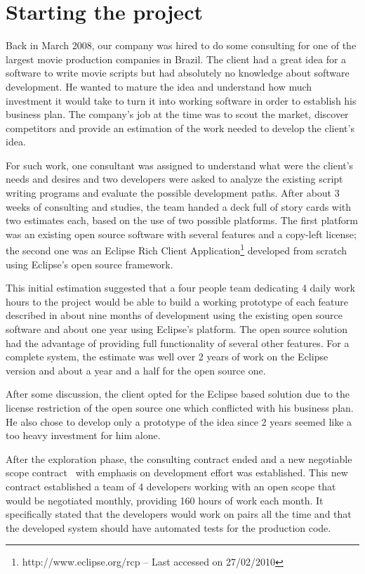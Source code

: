 \documentclass[lnbip]{svmultln}
\begin{document}
\section{Starting the project}
\label{sec:start}

Back in March 2008, our company was hired to do some consulting for
one of the largest movie production companies in Brazil. The client
had a great idea for a software to write movie scripts but had
absolutely no knowledge about software development.  He wanted to
mature the idea and understand how much investment it would take to
turn it into working software in order to establish his business
plan. The company's job at the time was to scout the market, discover
competitors and provide an estimation of the work needed to develop
the client's idea.

For such work, one consultant was assigned to understand what were the
client's needs and desires and two developers were asked to analyze
the existing script writing programs and evaluate the possible
development paths. After about 3 weeks of consulting and studies, the
team handed a deck full of story cards with two estimates each, based
on the use of two possible platforms. The first platform was an
existing open source software with several features and a copy-left
license; the second one was an Eclipse Rich Client
Application\footnote{http://www.eclipse.org/rcp -- Last accessed on
  27/02/2010} developed from scratch using Eclipse's open source
framework.

This initial estimation suggested that a four people team dedicating 4
daily work hours to the project would be able to build a working
prototype of each feature described in about nine months of
development using the existing open source software and about one year
using Eclipse's platform. The open source solution had the advantage
of providing full functionality of several other features. For a
complete system, the estimate was well over 2 years of work on the
Eclipse version and about a year and a half for the open source one.

After some discussion, the client opted for the Eclipse based solution
due to the license restriction of the open source one which conflicted
with his business plan. He also chose to develop only a prototype of
the idea since 2 years seemed like a too heavy investment for him
alone.

After the exploration phase, the consulting contract ended and a new
negotiable scope contract~\cite{XP} with emphasis on development
effort was established. This new contract established a team of 4
developers working with an open scope that would be negotiated
monthly, providing 160 hours of work each month. It specifically
stated that the developers would work on pairs all the time and that
the developed system should have automated tests for the production
code.
\end{document}
